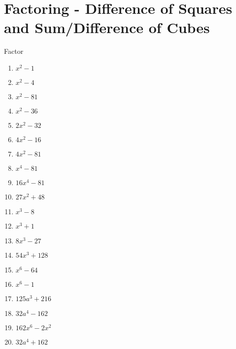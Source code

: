 \documentclass{article}
\begin{document}
\section{Factoring - Difference of Squares and Sum/Difference of Cubes}
Factor\\
\begin{enumerate}
\item $x^{2} - 1$
\item $x^{2} - 4$
\item $x^{2} - 81$
\item $x^{2} - 36$
\item $2x^{2} - 32$
\item $4x^{2} - 16$
\item $4x^{2} - 81$
\item $x^{4} - 81$
\item $16x^{4} - 81$
\item $27x^{2} + 48$
\item $x^{3} - 8$
\item $x^{3} + 1$
\item $8x^{3} - 27$
\item $54x^{3} + 128$
\item $x^{6} - 64$
\item $x^{6} - 1$
\item $125a^{3} + 216$
\item $32a^{4} - 162$
\item $162x^{6} -2x^{2}$
\item $32a^{4} + 162$
\end{enumerate}

\newpage
\end{document}
